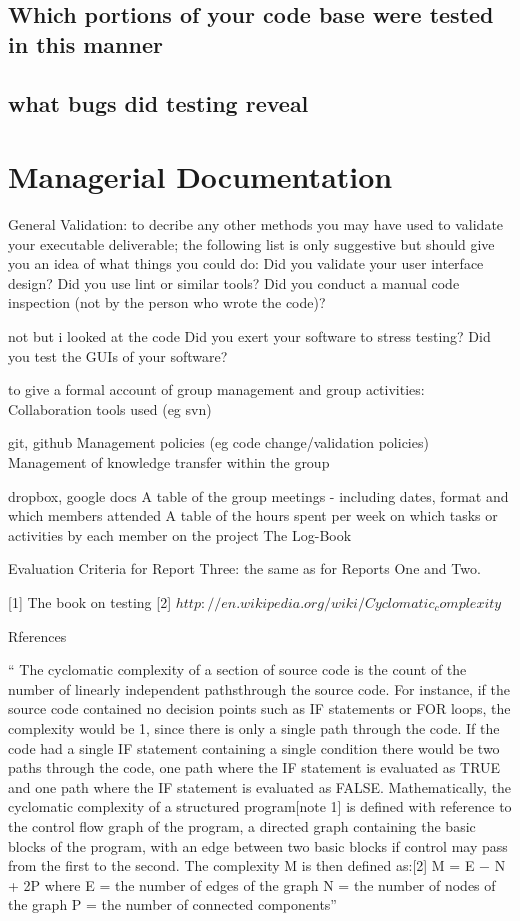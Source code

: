 \documentclass[10pt]{article}
\begin{document}
\subsection{Which portions of your code base were tested in this manner}

\subsection{what bugs did testing reveal}

\section{Managerial Documentation}

General Validation: to decribe any other methods you may have used to validate your executable deliverable; the following list is only suggestive but should give you an idea of what things you could do:
Did you validate your user interface design?
Did you use lint or similar tools?
Did you conduct a manual code inspection (not by the person who wrote the code)?

not but i looked at the code
Did you exert your software to stress testing?
Did you test the GUIs of your software?


to give a formal account of group management and group activities:
Collaboration tools used (eg svn)

git, github
Management policies (eg code change/validation policies)
Management of knowledge transfer within the group

dropbox, google docs
A table of the group meetings - including dates, format and which members attended
A table of the hours spent per week on which tasks or activities by each member on the project
The Log-Book


Evaluation Criteria for Report Three: the same as for Reports One and Two.

[1] The book on testing
[2] $ http://en.wikipedia.org/wiki/Cyclomatic_complexity$

Rferences


“ The cyclomatic complexity of a section of source code is the count of the number of linearly independent pathsthrough the source code. For instance, if the source code contained no decision points such as IF statements or FOR loops, the complexity would be 1, since there is only a single path through the code. If the code had a single IF statement containing a single condition there would be two paths through the code, one path where the IF statement is evaluated as TRUE and one path where the IF statement is evaluated as FALSE.
Mathematically, the cyclomatic complexity of a structured program[note 1] is defined with reference to the control flow graph of the program, a directed graph containing the basic blocks of the program, with an edge between two basic blocks if control may pass from the first to the second. The complexity M is then defined as:[2]
M = E − N + 2P
where
E = the number of edges of the graph
N = the number of nodes of the graph
P = the number of connected components”
\end{document}
